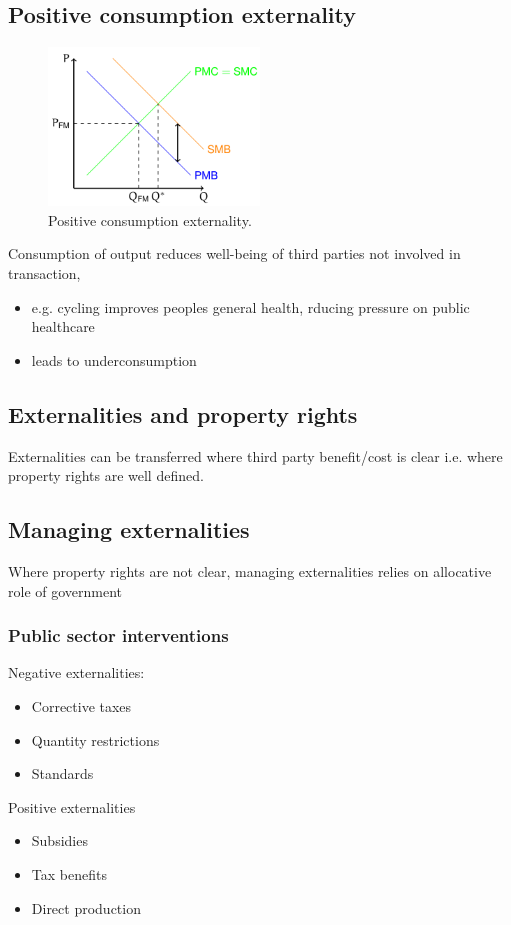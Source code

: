 \documentclass[class=report, crop=false, 12pt,a4paper]{standalone}
\begin{document}
\subsection{Positive consumption externality}
\begin{figure}[H]
	\centering
	\includegraphics[width = 0.5\textwidth]{../img/figure19.png}
	\caption{Positive consumption externality.}
\end{figure}
Consumption of output reduces well-being of third parties not involved in transaction,
\begin{itemize}
	\item e.g. cycling improves peoples general health, rducing pressure on public healthcare
	\item leads to underconsumption
\end{itemize}
\subsection{Externalities and property rights}
Externalities can be transferred where third party benefit/cost is clear i.e. where property rights are well defined.
\subsection{Managing externalities}
Where property rights are not clear, managing externalities relies on allocative role of government
\subsubsection{Public sector interventions}
Negative externalities:
\begin{itemize}
	\item Corrective taxes
	\item Quantity restrictions
	\item Standards
\end{itemize}
Positive externalities
\begin{itemize}
	\item Subsidies
	\item Tax benefits
	\item Direct production
\end{itemize}
\end{document}
